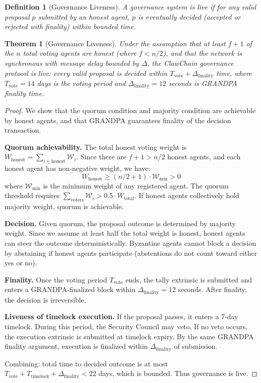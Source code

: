 \documentclass[conference]{IEEEtran}
\newtheorem{theorem}{Theorem}
\newtheorem{definition}{Definition}
\begin{document}
\begin{definition}[Governance Liveness]
A governance system is \emph{live} if for any valid proposal $p$ submitted by an honest agent, $p$ is eventually decided (accepted or rejected with finality) within bounded time.
\end{definition}

\begin{theorem}[Governance Liveness]\label{thm:gov_liveness}
Under the assumption that at least $f + 1$ of the $n$ total voting agents are honest (where $f < n/2$), and that the network is synchronous with message delay bounded by $\Delta$, the ClawChain governance protocol is live: every valid proposal is decided within $T_{\text{vote}} + \Delta_{\text{finality}}$ time, where $T_{\text{vote}} = 14$ days is the voting period and $\Delta_{\text{finality}} = 12$ seconds is GRANDPA finality time.
\end{theorem}

\begin{proof}
We show that the quorum condition and majority condition are achievable by honest agents, and that GRANDPA guarantees finality of the decision transaction.

\textbf{Quorum achievability.} The total honest voting weight is $W_{\text{honest}} = \sum_{i \in \text{honest}} \mathcal{W}_i$. Since there are $f+1 > n/2$ honest agents, and each honest agent has non-negative weight, we have:
\[
W_{\text{honest}} \geq (n/2 + 1) \cdot \mathcal{W}_{\min} > 0
\]
where $\mathcal{W}_{\min}$ is the minimum weight of any registered agent. The quorum threshold requires $\sum_{\text{voters}} \mathcal{W}_i > 0.5 \cdot W_{\text{total}}$. If honest agents collectively hold majority weight, quorum is achievable.

\textbf{Decision.} Given quorum, the proposal outcome is determined by majority weight. Since we assume at least half the total weight is honest, honest agents can steer the outcome deterministically. Byzantine agents cannot block a decision by abstaining if honest agents participate (abstentions do not count toward either yes or no).

\textbf{Finality.} Once the voting period $T_{\text{vote}}$ ends, the tally extrinsic is submitted and enters a GRANDPA-finalized block within $\Delta_{\text{finality}} = 12$ seconds. After finality, the decision is irreversible.

\textbf{Liveness of timelock execution.} If the proposal passes, it enters a 7-day timelock. During this period, the Security Council may veto. If no veto occurs, the execution extrinsic is submitted at timelock expiry. By the same GRANDPA finality argument, execution is finalized within $\Delta_{\text{finality}}$ of submission.

Combining: total time to decided outcome is at most $T_{\text{vote}} + T_{\text{timelock}} + \Delta_{\text{finality}} < 22$ days, which is bounded. Thus governance is live.
\end{proof}
\end{document}
